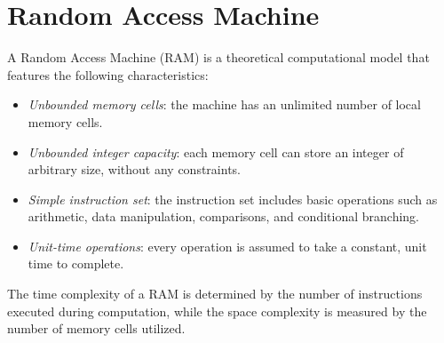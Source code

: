 \section{Random Access Machine}

\begin{definition}
    A Random Access Machine (RAM) is a theoretical computational model that features the following characteristics:
\end{definition}
\begin{itemize}
    \item \textit{Unbounded memory cells}: the machine has an unlimited number of local memory cells.
    \item \textit{Unbounded integer capacity}: each memory cell can store an integer of arbitrary size, without any constraints.
    \item \textit{Simple instruction set}: the instruction set includes basic operations such as arithmetic, data manipulation, comparisons, and conditional branching.
    \item \textit{Unit-time operations}: every operation is assumed to take a constant, unit time to complete.
\end{itemize}
The time complexity of a RAM is determined by the number of instructions executed during computation, while the space complexity is measured by the number of memory cells utilized.